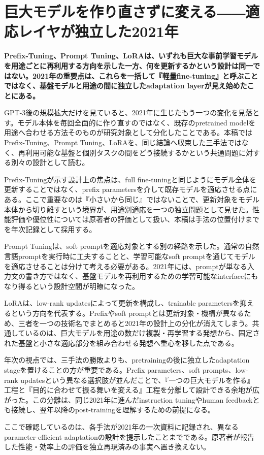 \section{巨大モデルを作り直さずに変える――適応レイヤが独立した2021年}
\label{pkg:adaptation-efficient-tuning}
\noindent\textbf{Prefix-Tuning、Prompt Tuning、LoRAは、いずれも巨大な事前学習モデルを用途ごとに再利用する方向を示した一方、何を更新するかという設計は同一ではない。2021年の重要点は、これらを一括して『軽量fine-tuning』と呼ぶことではなく、基盤モデルと用途の間に独立したadaptation layerが見え始めたことにある。}\autocite{src-ab9d63ddee6e,src-c1ad400391c9,src-dba095cd4e62}

GPT-3後の規模拡大だけを見ていると、2021年に生じたもう一つの変化を見落とす。モデル本体を毎回全面的に作り直すのではなく、既存のpretrained modelを用途へ合わせる方法そのものが研究対象として分化したことである。本稿ではPrefix-Tuning、Prompt Tuning、LoRAを、同じ結論へ収束した三手法ではなく、再利用可能な基盤と個別タスクの間をどう接続するかという共通問題に対する別々の設計として読む。\autocite{src-ab9d63ddee6e,src-c1ad400391c9,src-dba095cd4e62}


Prefix-Tuningが示す設計上の焦点は、full fine-tuningと同じようにモデル全体を更新することではなく、prefix parametersを介して既存モデルを適応させる点にある。ここで重要なのは『小さいから同じ』ではないことで、更新対象をモデル本体から切り離すという境界が、用途別適応を一つの独立問題として見せた。性能評価や優位性については原著者の評価として扱い、本稿は手法の位置付けまでを年次記録として採用する。\autocite{src-dba095cd4e62}


Prompt Tuningは、soft promptを適応対象とする別の経路を示した。通常の自然言語promptを実行時に工夫することと、学習可能なsoft promptを通じてモデルを適応させることは分けて考える必要がある。2021年には、promptが単なる入力文の書き方ではなく、基盤モデルを再利用するための学習可能なinterfaceにもなり得るという設計空間が明瞭になった。\autocite{src-c1ad400391c9}


LoRAは、low-rank updatesによって更新を構成し、trainable parametersを抑えるという方向を代表する。Prefixやsoft promptとは更新対象・機構が異なるため、三者を一つの技術名でまとめると2021年の設計上の分化が消えてしまう。共通しているのは、巨大モデルを用途の数だけ複製・再学習する発想から、固定された基盤と小さな適応部分を組み合わせる発想へ重心を移した点である。\autocite{src-ab9d63ddee6e}


年次の視点では、三手法の勝敗よりも、pretrainingの後に独立したadaptation stageを置けることの方が重要である。Prefix parameters、soft prompts、low-rank updatesという異なる選択肢が並んだことで、『一つの巨大モデルを作る』工程と『目的に合わせて振る舞いを変える』工程を分離して設計できる余地が広がった。この分離は、同じ2021年に進んだinstruction tuningやhuman feedbackとも接続し、翌年以降のpost-trainingを理解するための前提になる。\autocite{src-ab9d63ddee6e,src-c1ad400391c9,src-dba095cd4e62}


\begin{claimboundary}
ここで確認しているのは、各手法が2021年の一次資料に記録され、異なるparameter-efficient adaptationの設計を提示したことまでである。原著者が報告した性能・効率上の評価を独立再現済みの事実へ置き換えない。\autocite{src-ab9d63ddee6e,src-c1ad400391c9,src-dba095cd4e62}
\end{claimboundary}
